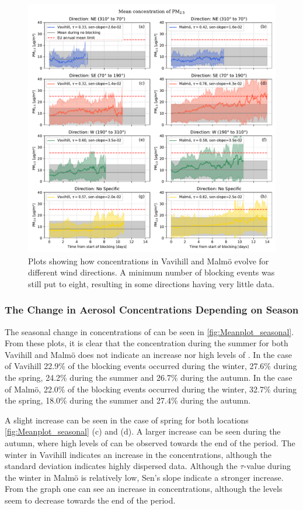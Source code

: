 \begin{figure}[H]
    \centering
    \includegraphics[width=\textwidth]{Figures/Meanplot_dir.pdf}
    \caption{Plots showing how \PM concentrations in Vavihill and Malmö evolve for different wind directions. A minimum number of blocking events was still put to eight, resulting in some directions having very little data.}
    \label{fig:Meanplot_wind}
\end{figure}

 

\subsubsection{The Change in Aerosol Concentrations Depending on Season}
The seasonal change in concentrations of \PM can be seen in \autoref{fig:Meanplot_seasonal}. From these plots, it is clear that the concentration during the summer for both Vavihill and Malmö does not indicate an increase nor high levels of \PM. In the case of Vavihill 22.9\% of the blocking events occurred during the winter, 27.6\% during the spring, 24.2\% during the summer and 26.7\% during the autumn. In the case of Malmö, 22.0\% of the blocking events occurred during the winter, 32.7\% during the spring, 18.0\% during the summer and 27.4\% during the autumn.

A slight increase can be seen in the case of spring for both locations \autoref{fig:Meanplot_seasonal} (c) and (d). A larger increase can be seen during the autumn, where high levels of \PM  can be observed towards the end of the period. The winter in Vavihill indicates an increase in the \PM  concentrations, although the standard deviation indicates highly dispersed data. Although the $\tau$-value during the winter in Malmö is relatively low, Sen's slope indicate a stronger increase. From the graph one can see an increase in \PM  concentrations, although the levels seem to decrease towards the end of the period. 

